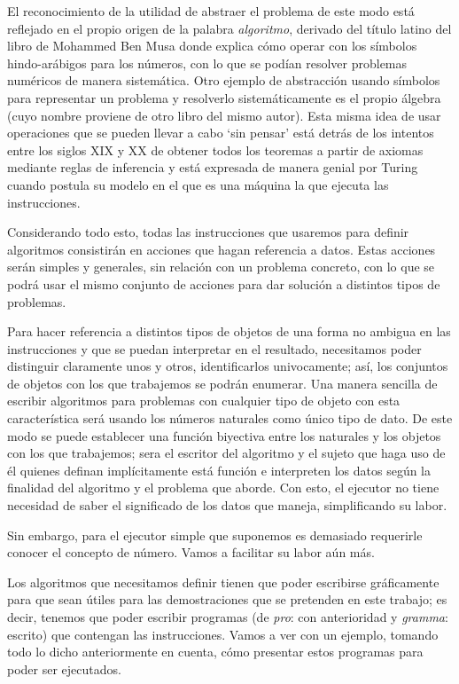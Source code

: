 El reconocimiento de la utilidad de abstraer el problema de este modo está reflejado en el propio
origen de la palabra {\it algoritmo}, derivado del título latino del libro de Mohammed Ben Musa
donde explica cómo operar con los símbolos hindo-arábigos para los números, con lo que se podían
resolver problemas numéricos de manera sistemática. Otro ejemplo de abstracción usando símbolos para
representar un problema y resolverlo sistemáticamente es el propio álgebra (cuyo nombre proviene de
otro libro del mismo autor). Esta misma idea de usar operaciones que se pueden llevar a cabo ‘sin
pensar’ está detrás de los intentos entre los siglos XIX y XX de obtener todos los teoremas a partir
de axiomas mediante reglas de inferencia y está expresada de manera genial por Turing cuando postula
su modelo en el que es una máquina la que ejecuta las instrucciones.

Considerando todo esto, todas las instrucciones que usaremos para definir algoritmos consistirán en
acciones que hagan referencia a datos. Estas acciones serán simples y generales, sin relación con un
problema concreto, con lo que se podrá usar el mismo conjunto de acciones para dar solución a
distintos tipos de problemas.

Para hacer referencia a distintos tipos de objetos de una forma no ambigua en las instrucciones y
que se puedan interpretar en el resultado, necesitamos poder distinguir claramente unos y otros,
identificarlos univocamente; así, los conjuntos de objetos con los que trabajemos se podrán
enumerar. Una manera sencilla de escribir algoritmos para problemas con cualquier tipo de objeto con
esta característica será usando los números naturales como único tipo de dato. De este modo se puede
establecer una función biyectiva entre los naturales y los objetos con los que trabajemos; sera el
escritor del algoritmo y el sujeto que haga uso de él quienes definan implícitamente está función e
interpreten los datos según la finalidad del algoritmo y el problema que aborde. Con esto, el
ejecutor no tiene necesidad de saber el significado de los datos que maneja, simplificando su labor.

Sin embargo, para el ejecutor simple que suponemos es demasiado requerirle conocer el concepto de
número. Vamos a facilitar su labor aún más.

Los algoritmos que necesitamos definir tienen que poder escribirse gráficamente para que sean útiles
para las demostraciones que se pretenden en este trabajo; es decir, tenemos que poder escribir
programas (de {\it pro}: con anterioridad y {\it gramma}: escrito) que contengan las
instrucciones. Vamos a ver con un ejemplo, tomando todo lo dicho anteriormente en cuenta, cómo
presentar estos programas para poder ser ejecutados.


